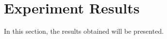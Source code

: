 
\chapter{Experiment Results}\label{ch:results}
In this section, the results obtained will be presented.



	
\begin{comment}
This is my comment.
Note that it can span multiple lines.
This is very useful.
\end{comment}